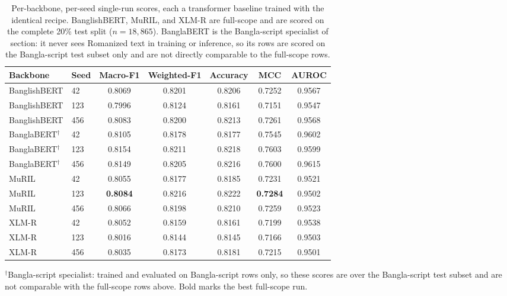 \documentclass[11pt,a4paper]{article}
\def\cref#1{section}%
\begin{document}
\begin{table}[!htbp]
\centering
\caption{Per-backbone, per-seed single-run scores, each a transformer baseline trained with the identical recipe. BanglishBERT, MuRIL, and XLM-R are full-scope and are scored on the complete 20\% test split ($n = 18{,}865$). BanglaBERT is the Bangla-script specialist of \cref{sec:scriptaware}: it never sees Romanized text in training or inference, so its rows are scored on the Bangla-script test subset only and are not directly comparable to the full-scope rows.}
\label{tab:perrun}
\small
\begin{tabular}{@{}llccccc@{}}
\toprule
\textbf{Backbone} & \textbf{Seed} & \textbf{Macro-F1} & \textbf{Weighted-F1} & \textbf{Accuracy} & \textbf{MCC} & \textbf{AUROC} \\
\midrule
BanglishBERT & 42 & 0.8069 & 0.8201 & 0.8206 & 0.7252 & 0.9567 \\
BanglishBERT & 123 & 0.7996 & 0.8124 & 0.8161 & 0.7151 & 0.9547 \\
BanglishBERT & 456 & 0.8083 & 0.8200 & 0.8213 & 0.7261 & 0.9568 \\
BanglaBERT$^{\dagger}$ & 42 & 0.8105 & 0.8178 & 0.8177 & 0.7545 & 0.9602 \\
BanglaBERT$^{\dagger}$ & 123 & 0.8154 & 0.8211 & 0.8218 & 0.7603 & 0.9599 \\
BanglaBERT$^{\dagger}$ & 456 & 0.8149 & 0.8205 & 0.8216 & 0.7600 & 0.9615 \\
MuRIL & 42 & 0.8055 & 0.8177 & 0.8185 & 0.7231 & 0.9521 \\
MuRIL & 123 & \textbf{0.8084} & 0.8216 & 0.8222 & \textbf{0.7284} & 0.9502 \\
MuRIL & 456 & 0.8066 & 0.8198 & 0.8210 & 0.7259 & 0.9523 \\
XLM-R & 42 & 0.8052 & 0.8159 & 0.8161 & 0.7199 & 0.9538 \\
XLM-R & 123 & 0.8016 & 0.8144 & 0.8145 & 0.7166 & 0.9503 \\
XLM-R & 456 & 0.8035 & 0.8173 & 0.8181 & 0.7215 & 0.9501 \\
\bottomrule
\end{tabular}

\vspace{2pt}
{\footnotesize $^{\dagger}$Bangla-script specialist: trained and evaluated on Bangla-script rows only, so these
scores are over the Bangla-script test subset and are not comparable with the full-scope rows above.
Bold marks the best full-scope run.}
\end{table}
\end{document}
